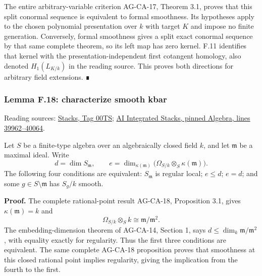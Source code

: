 \documentclass[11pt,a4paper,openany]{report}
\begin{document}
The entire arbitrary-variable criterion AG-CA-17, Theorem 3.1, proves that this split conormal sequence is equivalent to formal smoothness. Its hypotheses apply to the chosen polynomial presentation over \(k\) with target \(K\) and impose no finite generation. Conversely, formal smoothness gives a split exact conormal sequence by that same complete theorem, so its left map has zero kernel. F.11 identifies that kernel with the presentation-independent first cotangent homology, also denoted \(H_1(L_{K/k})\) in the reading source. This proves both directions for arbitrary field extensions. ∎

\label{AG-RG-S05-algebra-lemma-characterize-smooth-kbar}

\subsubsection{Lemma F.18: characterize smooth kbar}\label{AG-RG-S05-lemma-f.18-characterize-smooth-kbar}

Reading sources: \href{https://stacks.math.columbia.edu/tag/00TS}{Stacks, Tag 00TS}; \href{https://github.com/KokunoYumeto/unofficial-stacks-project-ai-drafts/blob/565b10e987aba5969b21145a0833f42d69f96790/algebra.tex\#L39962-L40064}{AI Integrated Stacks, pinned Algebra, lines 39962--40064}.

Let \(S\) be a finite-type algebra over an algebraically closed field \(k\), and let \(\mathfrak m\) be a maximal ideal. Write \[d=\dim S_{\mathfrak m},\qquad
e=\dim_{\kappa(\mathfrak m)}
\bigl(\Omega_{S/k}\otimes_S\kappa(\mathfrak m)\bigr).\] The following four conditions are equivalent: \(S_{\mathfrak m}\) is regular local; \(e\leq d\); \(e=d\); and some \(g\in S\setminus\mathfrak m\) has \(S_g/k\) smooth.

\textbf{Proof.} The complete rational-point result AG-CA-18, Proposition 3.1, gives \(\kappa(\mathfrak m)=k\) and \[\Omega_{S/k}\otimes_Sk\cong\mathfrak m/\mathfrak m^2.\] The embedding-dimension theorem of AG-CA-14, Section 1, says \(d\leq\dim_k\mathfrak m/\mathfrak m^2\), with equality exactly for regularity. Thus the first three conditions are equivalent. The same complete AG-CA-18 proposition proves that smoothness at this closed rational point implies regularity, giving the implication from the fourth to the first.
\end{document}
